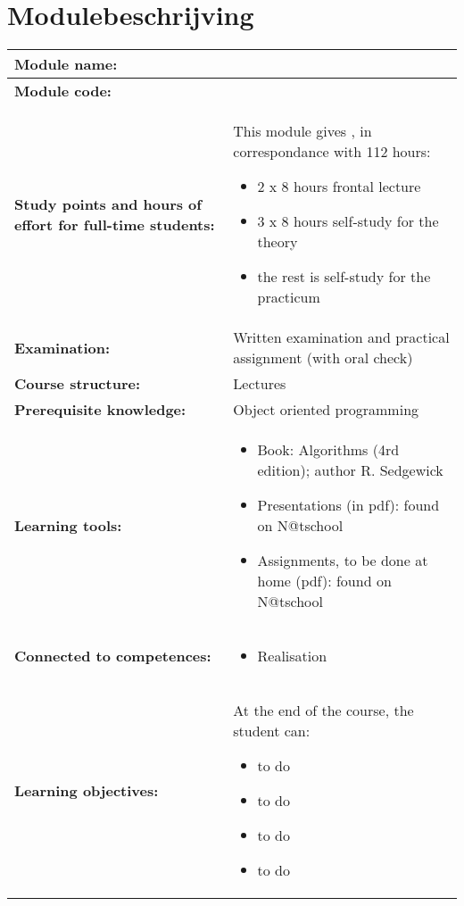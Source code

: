 \section*{Modulebeschrijving}
\begin{tabularx}{\textwidth}{|>{\columncolor{lichtGrijs}} p{}|X|}
	\hline
	\textbf{Module name:} & \modulenaam\\
	\hline
	\textbf{Module code: }& \modulecode\\
	\hline
	\textbf{Study points \newline and hours of effort for full-time students:} & This module gives \stdPunten, in correspondance with 112 hours:
	\begin{itemize}
		\item 2 x 8 hours frontal lecture
		\item 3 x 8 hours self-study for the theory
		\item the rest is self-study for the practicum
	\end{itemize} \\
	\hline
	\textbf{Examination:} & Written examination and practical assignment (with oral check) \\
	\hline
	\textbf{Course structure:} & Lectures \\
	\hline
	\textbf{Prerequisite knowledge:} & Object oriented programming \\
	\hline
	\textbf{Learning tools:}  &
		\begin{itemize}
			\item Book: Algorithms (4rd edition); author R. Sedgewick
			\item Presentations (in pdf): found on N@tschool
			\item Assignments, to be done at home (pdf): found on N@tschool
		\end{itemize} \\
	\hline
	\textbf{Connected to \newline competences:} &
		\begin{itemize}
			\item Realisation
		\end{itemize} \\
	\hline
	\textbf{Learning objectives:} &
		At the end of the course, the student can:
			\begin{itemize}
				\item to do 
				\item to do
				\item to do
				\item to do
			\end{itemize} \\
		
	\hline
\end{tabularx}
\newpage

